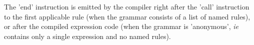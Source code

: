 The 'end' instruction is emitted by the compiler right after the
'call' instruction to the first applicable rule (when the grammar
consists of a list of named rules), or after the compiled expression
code (when the grammar is 'anonymous', \textit{ie} contains only a
single expression and no named rules).
